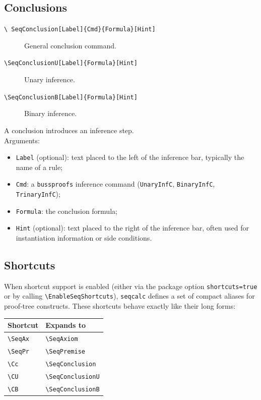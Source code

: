 \documentclass[a4paper,1pt]{article}
\begin{document}
\subsection{Conclusions}
\label{subsec:conclusions}
\begin{description}
    \item[\texttt{\textbackslash
    SeqConclusion[Label]\{Cmd\}\{Formula\}[Hint]}]
        General conclusion command.
    \item[\texttt{\textbackslash SeqConclusionU[Label]\{Formula\}[Hint]}]
        Unary inference.
    \item[\texttt{\textbackslash SeqConclusionB[Label]\{Formula\}[Hint]}]
        Binary inference.
\end{description}
A conclusion introduces an inference step.\\
Arguments:
\begin{itemize}
    \item \texttt{Label} (optional): text placed to the left of the inference bar, typically the name of a rule;
    \item \texttt{Cmd}: a \texttt{bussproofs} inference command (\texttt{UnaryInfC}, \texttt{BinaryInfC}, \texttt{TrinaryInfC});
    \item \texttt{Formula}: the conclusion formula;
    \item \texttt{Hint} (optional): text placed to the right of the inference bar, often used for instantiation information or side conditions.
\end{itemize}

\subsection{Shortcuts}
\label{subsec:shortcuts}
When shortcut support is enabled (either via the package option \texttt{shortcuts=true} or by calling \texttt{\textbackslash EnableSeqShortcuts}), \texttt{seqcalc} defines a set of compact aliases for proof‑tree constructs. These shortcuts behave exactly like their long forms:
\begin{center}
    \begin{tabular}{ll}
        \toprule
        \textbf{Shortcut} & \textbf{Expands to} \\
        \midrule
        \texttt{\textbackslash SeqAx} & \texttt{\textbackslash SeqAxiom} \\
        \texttt{\textbackslash SeqPr} & \texttt{\textbackslash SeqPremise} \\
        \texttt{\textbackslash Cc} & \texttt{\textbackslash SeqConclusion} \\
        \texttt{\textbackslash CU} & \texttt{\textbackslash SeqConclusionU} \\
        \texttt{\textbackslash CB} & \texttt{\textbackslash SeqConclusionB} \\
        \bottomrule
    \end{tabular}
\end{center}
\end{document}

